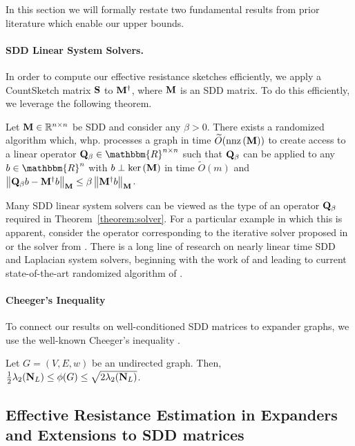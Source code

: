 In this section we will formally restate two fundamental results from prior literature which enable our upper bounds.

\paragraph{SDD Linear System Solvers.}{
In order to compute our effective resistance sketches efficiently, we apply a CountSketch matrix $\mathbf{S}$ to $\mathbf{M}^\dagger$, where $\mathbf{M}$ is an SDD matrix. To do this efficiently, we leverage the following theorem.

\begin{theorem}\label{theorem:solver}  Let $\mathbf{M} \in \mathbb{R}^{n \times n}$ be SDD and consider any $\beta > 0$. There exists a randomized algorithm which, whp. processes a graph in time $\widetilde{O}(\mathrm{nnz}\left({\mathbf{M}}\right))$ to create access to a linear operator $\Q_{\beta} \in \mathbbm{R}^{n \times n}$ such that $\mathbf{Q}_{\beta}$ can be applied to any $b \in \mathbbm{R}^n$ with $b \perp \mathrm{ker}\left(\mathbf{M}\right)$ in time $\widetilde{O}(m)$ and $\left\Vert \mathbf{Q}_\beta b - \mathbf{M}^\dagger b \right\Vert_{\mathbf{M}} \leq \beta \left\Vert \mathbf{M}^\dagger b \right\Vert_{\mathbf{M}}$. 
\end{theorem}

Many SDD linear system solvers can be viewed as the type of an operator $\mathbf{Q}_\beta$ required in Theorem~\ref{theorem:solver}. For a particular example in which this is apparent, consider the operator corresponding to the iterative solver proposed in \cite{RS16} or the solver from \cite{KOSZ13}. There is a long line of research on nearly linear time SDD and Laplacian system solvers, beginning with the work of \cite{spielman2008local} and leading to current state-of-the-art randomized algorithm of \cite{jambulapati2023ultrasparse}. 
}

\paragraph{Cheeger's Inequality}{
To connect our results on well-conditioned SDD matrices to expander graphs, we use the well-known Cheeger's inequality \cite{Cheeger}. 
\begin{theorem}\label{thm:cheeger} Let $G = (V, E, w)$ be an undirected graph. Then, $\frac{1}{2} \lambda_2(\mathbf{N}_{L}) \leq \phi(G) \leq \sqrt{2 \lambda_2(\mathbf{N}_{L})}$. 
\end{theorem}}

\subsection{Effective Resistance Estimation in Expanders and Extensions to SDD matrices }\label{subsection:upper_bound_new}

